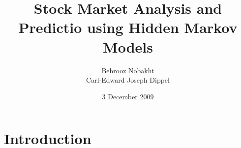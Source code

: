 \documentclass{acm_proc_article-sp}
\begin{document}
\title{Stock Market Analysis and Predictio using Hidden Markov Models}

\author{
  \alignauthor Behrooz Nobakht \\ 
  \alignauthor Carl-Edward Joseph Dippel\\ 
}

\date{3 December 2009}

\maketitle
\begin{abstract}
\end{abstract}

\section{Introduction}
\end{document}
